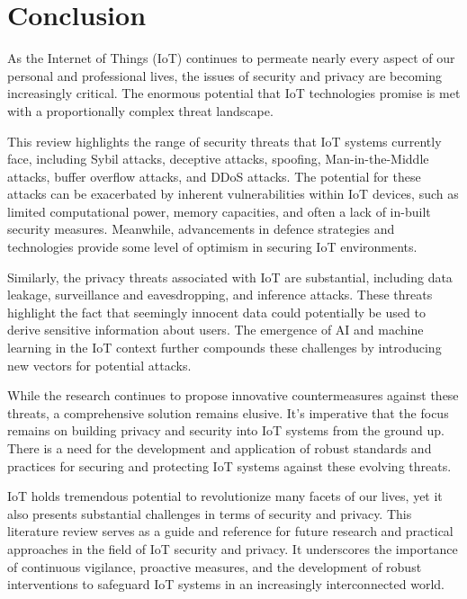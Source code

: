 

\section{Conclusion}
\label{sec:conclusion}
As the Internet of Things (IoT) continues to permeate nearly every aspect of our personal and professional lives, the issues of security and privacy are becoming increasingly critical. The enormous potential that IoT technologies promise is met with a proportionally complex threat landscape.

This review highlights the range of security threats that IoT systems currently face, including Sybil attacks, deceptive attacks, spoofing, Man-in-the-Middle attacks, buffer overflow attacks, and DDoS attacks. The potential for these attacks can be exacerbated by inherent vulnerabilities within IoT devices, such as limited computational power, memory capacities, and often a lack of in-built security measures. Meanwhile, advancements in defence strategies and technologies provide some level of optimism in securing IoT environments.

Similarly, the privacy threats associated with IoT are substantial, including data leakage, surveillance and eavesdropping, and inference attacks. These threats highlight the fact that seemingly innocent data could potentially be used to derive sensitive information about users. The emergence of AI and machine learning in the IoT context further compounds these challenges by introducing new vectors for potential attacks.

While the research continues to propose innovative countermeasures against these threats, a comprehensive solution remains elusive. It's imperative that the focus remains on building privacy and security into IoT systems from the ground up. There is a need for the development and application of robust standards and practices for securing and protecting IoT systems against these evolving threats.

IoT holds tremendous potential to revolutionize many facets of our lives, yet it also presents substantial challenges in terms of security and privacy. This literature review serves as a guide and reference for future research and practical approaches in the field of IoT security and privacy. It underscores the importance of continuous vigilance, proactive measures, and the development of robust interventions to safeguard IoT systems in an increasingly interconnected world.
